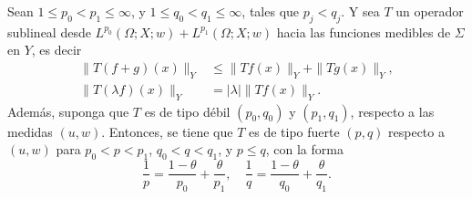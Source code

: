 \begin{theorem}
	Sean $1\leq p_0 < p_1 \leq \infty$, y $1\leq q_0 < q_1 \leq \infty$, tales que $p_j<q_j$. Y sea $T$ un operador sublineal desde $L^{p_0}(\Omega;X; w)+L^{p_1}(\Omega;X; w)$ hacia las funciones medibles de $\Sigma$ en $Y$, es decir 
	\begin{align*}
		\|T(f+g)(x)\|_Y & \leq \|Tf(x)\|_Y + \|Tg(x)\|_Y,\\
		\|T(\lambda f)(x)\|_Y &= |\lambda|\|Tf(x)\|_Y.
	\end{align*}
	Además, suponga que $T$ es de tipo débil $(p_0, q_0)$ y $(p_1, q_1)$, respecto a las medidas $(u, w)$. Entonces, se tiene que $T$ es de tipo fuerte $(p, q)$ respecto a $(u, w)$ para $p_0<p<p_1$, $q_0<q<q_1$, y $p\leq q$, con la forma 
	\begin{equation*}
		\frac{1}{p} = \frac{1-\theta}{p_0} + \frac{\theta}{p_1}, \quad \frac{1}{q} = \frac{1-\theta}{q_0} + \frac{\theta}{q_1}.
	\end{equation*}
\end{theorem}
